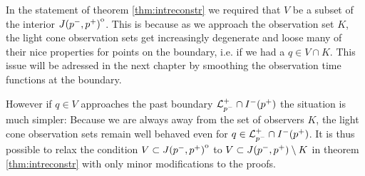 \begin{remark}\label{rmk:ReconstrPastBoundary}
    In the statement of theorem \ref{thm:intreconstr} we required that $V$ be a subset of the interior ${\kern0ptJ(p^-,p^+)}^{\mathrm{o}}$. This is because as we approach the observation set $K$, the light cone observation sets get increasingly degenerate and loose many of their nice properties for points on the boundary, i.e. if we had a $q\in V\cap K$. This issue will be adressed in the next chapter by smoothing the observation time functions at the boundary.

    However if $q\in V$ approaches the past boundary ${\mathcal{L}}^+_{p^-}\cap I^-(p^+)$ the situation is much simpler: Because we are always away from the set of observers $K$, the light cone observation sets remain well behaved even for $q\in {\mathcal{L}}^+_{p^-}\cap I^-(p^+)$. It is thus possible to relax the condition $V\subset {\kern0ptJ(p^-,p^+)}^{\mathrm{o}}$ to $V\subset J(p^-,p^+) \setminus K$ in theorem \ref{thm:intreconstr} with only minor modifications to the proofs.
\end{remark}